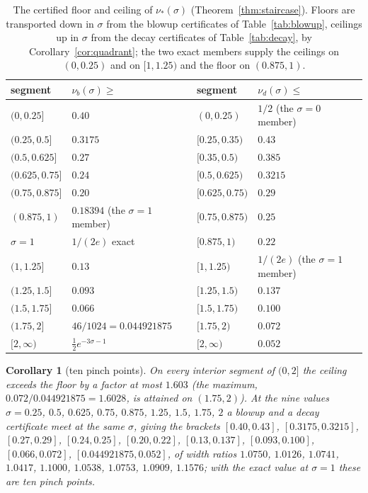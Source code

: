 \documentclass[11pt,a4paper]{article}
\theoremstyle{plain}
\newtheorem{corollary}[theorem]{Corollary}
\theoremstyle{definition}
\begin{document}
\begin{table}[htbp]
\centering\small
\caption{The certified floor and ceiling of $\nu_*(\sigma)$ (Theorem~\ref{thm:staircase}). Floors are transported down in $\sigma$ from the blowup certificates of Table~\ref{tab:blowup}, ceilings up in $\sigma$ from the decay certificates of Table~\ref{tab:decay}, by Corollary~\ref{cor:quadrant}; the two exact members supply the ceilings on $(0,0.25)$ and on $[1,1.25)$ and the floor on $(0.875,1)$.}\label{tab:staircase}
\begin{tabular}{@{}llll@{}}
\toprule
segment & $\nu_b(\sigma)\ge$ & segment & $\nu_d(\sigma)\le$\\
\midrule
$(0,0.25]$ & $0.40$ & $(0,0.25)$ & $1/2$ (the $\sigma=0$ member)\\
$(0.25,0.5]$ & $0.3175$ & $[0.25,0.35)$ & $0.43$\\
$(0.5,0.625]$ & $0.27$ & $[0.35,0.5)$ & $0.385$\\
$(0.625,0.75]$ & $0.24$ & $[0.5,0.625)$ & $0.3215$\\
$(0.75,0.875]$ & $0.20$ & $[0.625,0.75)$ & $0.29$\\
$(0.875,1)$ & $0.18394$ (the $\sigma=1$ member) & $[0.75,0.875)$ & $0.25$\\
$\sigma=1$ & $1/(2e)$ exact & $[0.875,1)$ & $0.22$\\
$(1,1.25]$ & $0.13$ & $[1,1.25)$ & $1/(2e)$ (the $\sigma=1$ member)\\
$(1.25,1.5]$ & $0.093$ & $[1.25,1.5)$ & $0.137$\\
$(1.5,1.75]$ & $0.066$ & $[1.5,1.75)$ & $0.100$\\
$(1.75,2]$ & $46/1024=0.044921875$ & $[1.75,2)$ & $0.072$\\
$[2,\infty)$ & $\tfrac12e^{-3\sigma-1}$ \cite[Theorem~5]{Sak03b} & $[2,\infty)$ & $0.052$\\
\bottomrule
\end{tabular}
\end{table}

\begin{corollary}[ten pinch points]\label{cor:pinch}
On every interior segment of $(0,2]$ the ceiling exceeds the floor by a factor at most $1.603$ (the maximum, $0.072/0.044921875=1.6028$, is attained on $(1.75,2)$). At the nine values $\sigma=0.25$, $0.5$, $0.625$, $0.75$, $0.875$, $1.25$, $1.5$, $1.75$, $2$ a blowup and a decay certificate meet at the same $\sigma$, giving the brackets $[0.40,0.43]$, $[0.3175,0.3215]$, $[0.27,0.29]$, $[0.24,0.25]$, $[0.20,0.22]$, $[0.13,0.137]$, $[0.093,0.100]$, $[0.066,0.072]$, $[0.044921875,0.052]$, of width ratios $1.0750$, $1.0126$, $1.0741$, $1.0417$, $1.1000$, $1.0538$, $1.0753$, $1.0909$, $1.1576$; with the exact value at $\sigma=1$ these are ten pinch points.
\end{corollary}
\end{document}
